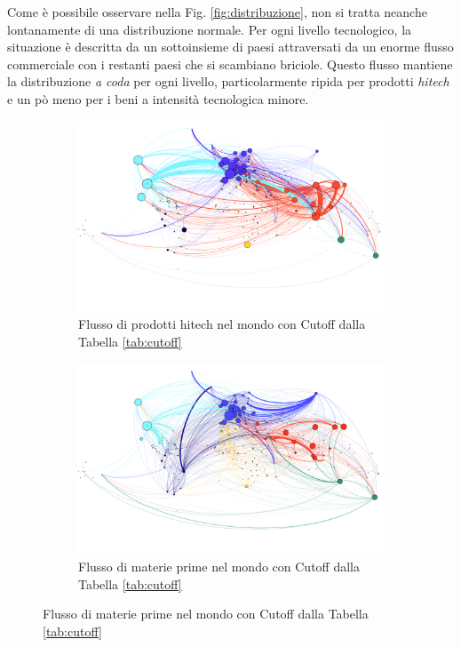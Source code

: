 \documentclass[]{article}
\begin{document}
\begin{multicols}{2}
	Come è possibile osservare nella Fig. \ref{fig:distribuzione}, non si tratta neanche lontanamente di una distribuzione normale. Per ogni livello tecnologico, la situazione è descritta da un sottoinsieme di paesi attraversati da un enorme flusso commerciale con i restanti paesi che si scambiano briciole. Questo flusso mantiene la distribuzione \textit{a coda} per ogni livello, particolarmente ripida per prodotti \textit{hitech} e un pò meno per i beni a intensità tecnologica minore.
	\begin{figure}[]
		\centering
		\begin{subfigure}[b]{1\textwidth}
			\includegraphics[width=\textwidth]{img/world-hitech.png}
			\caption{Flusso di prodotti hitech nel mondo con Cutoff dalla Tabella \ref{tab:cutoff}}
			\label{subfig:world-hitech}
		\end{subfigure}
		\begin{subfigure}[b]{1\textwidth}
			\includegraphics[width=\textwidth]{img/world-comm.png}
			\caption{Flusso di materie prime nel mondo con Cutoff dalla Tabella \ref{tab:cutoff}}

\end{subfigure}
\end{figure}
\end{multicols}
\end{document}
